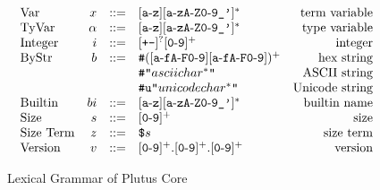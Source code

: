 \documentclass[../main.tex]{subfiles}
\begin{document}
\begin{figure*}[t]
    \centering
    \[\begin{array}{lrclr}
        \textrm{Var}     & x  & ::= & [\texttt{a}\!\hyphen{}\!\texttt{z}][\texttt{a}\!\hyphen{}\!\texttt{zA}\!\hyphen{}\!\texttt{Z0}\!\hyphen{}\!\texttt{9\_'}]^*                                                           & \textrm{term variable}\\
        \textrm{TyVar}   & \alpha & ::= & [\texttt{a}\!\hyphen{}\!\texttt{z}][\texttt{a}\!\hyphen{}\!\texttt{zA}\!\hyphen{}\!\texttt{Z0}\!\hyphen{}\!\texttt{9\_'}]^*                                                      & \textrm{type variable}\\
        \textrm{Integer} & i  & ::= & [\texttt{+-}]^?[\texttt{0}\!\hyphen{}\!\texttt{9}]^+                                                                                                                                  & \textrm{integer}\\
        \textrm{ByStr}   & b  & ::= & \texttt{\#}([\texttt{a}\!\hyphen{}\!\texttt{fA}\!\hyphen{}\!\texttt{F0}\!\hyphen{}\!\texttt{9}][\texttt{a}\!\hyphen{}\!\texttt{fA}\!\hyphen{}\!\texttt{F0}\!\hyphen{}\!\texttt{9}])^+ & \textrm{hex string}\\
                         &    &     & \texttt{\#"}asciichar^*\texttt{"}   & \textrm{ASCII string}\\
                         &    &     & \texttt{\#u"}unicodechar^*\texttt{"}    & \textrm{Unicode string}\\
        \textrm{Builtin}    & bi  & ::= & [\texttt{a}\!\hyphen{}\!\texttt{z}][\texttt{a}\!\hyphen{}\!\texttt{zA}\!\hyphen{}\!\texttt{Z0}\!\hyphen{}\!\texttt{9\_'}]^*                                                          & \textrm{builtin name}\\
        \textrm{Size} & s  & ::= & [\texttt{0}\!\hyphen{}\!\texttt{9}]^+                                                                                                                                  & \textrm{size}\\
        \textrm{Size Term} & z  & ::= & \texttt{\$} s                                                     & \textrm{size term}\\
        
        \textrm{Version} & v & ::= & [\texttt{0}\!\hyphen{}\!\texttt{9}]^+.[\texttt{0}\!\hyphen{}\!\texttt{9}]^+.[\texttt{0}\!\hyphen{}\!\texttt{9}]^+ & \textrm{version}
    \end{array}\]
    \caption{Lexical Grammar of Plutus Core}
    \label{fig:Plutus_core_lexical_grammar}
\end{figure*}
\end{document}
